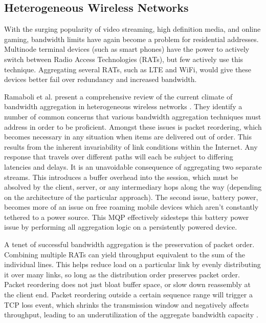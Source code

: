 \documentclass[12pt]{article}
\begin{document}
\subsection{Heterogeneous Wireless Networks}

	With the surging popularity of video streaming, high definition media, and online gaming, bandwidth limits have again become a problem for residential addresses. Multinode terminal devices (such as smart phones) have the power to actively switch between Radio Access Technologies (RATs), but few actively use this technique. Aggregating several RATs, such as LTE and WiFi, would give these devices better fail over redundancy and increased bandwidth.

	Ramaboli et al. present a comprehensive review of the current climate of bandwidth aggregation in heterogeneous wireless networks \cite{Ramaboli20121674}. They identify a number of common concerns that various bandwidth aggregation techniques must address in order to be proficient. Amongst these issues is packet reordering, which becomes necessary in any situation when items are delivered out of order. This results from the inherent invariability of link conditions within the Internet. Any response that travels over different paths will each be subject to differing latencies and delays. It is an unavoidable consequence of aggregating two separate streams. This introduces a buffer overhead into the session, which must be absolved by the client, server, or any intermediary hops along the way (depending on the architecture of the particular approach). The second issue, battery power, becomes more of an issue on free roaming mobile devices which aren't constantly tethered to a power source. This MQP effectively sidesteps this battery power issue by performing all aggregation logic on a persistently powered device.

	A tenet of successful bandwidth aggregation is the preservation of packet order. Combining multiple RATs can yield throughput equivalent to the sum of the individual lines. This helps reduce load on a particular link by evenly distributing it over many links, so long as the distribution order preserves packet order. Packet reordering does not just bloat buffer space, or slow down reassembly at the client end. Packet reordering outside a certain sequence range will trigger a TCP loss event, which shrinks the transmission window and negatively affects throughput, leading to an underutilization of the aggregate bandwidth capacity \cite{Ramaboli20121674}.
\end{document}
